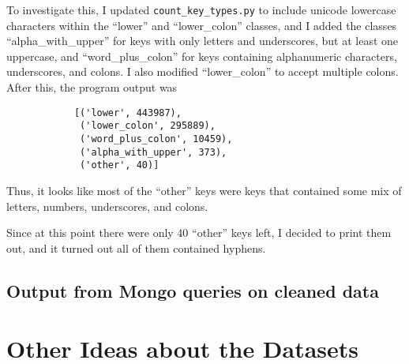 \documentclass{article}
\begin{document}
            To investigate this, I updated \texttt{count\_key\_types.py} to
            include unicode lowercase characters within the ``lower'' and
            ``lower\_colon'' classes, and I added the classes
            ``alpha\_with\_upper'' for keys with only letters and underscores,
            but at least one uppercase, and ``word\_plus\_colon'' for keys
            containing alphanumeric characters, underscores, and colons. I also
            modified ``lower\_colon'' to accept multiple colons. After this, the
            program output was 
            \begin{lstlisting}
            [('lower', 443987),
             ('lower_colon', 295889),
             ('word_plus_colon', 10459),
             ('alpha_with_upper', 373),
             ('other', 40)]
            \end{lstlisting}
            Thus, it looks like most of the ``other'' keys were keys that
            contained some mix of letters, numbers, underscores, and colons.
            
            Since at this point there were only 40 ``other'' keys left, I
            decided to print them out, and it turned out all of them contained
            hyphens.
        \subsection{Output from Mongo queries on cleaned data}
    \section{Other Ideas about the Datasets}
\end{document}
